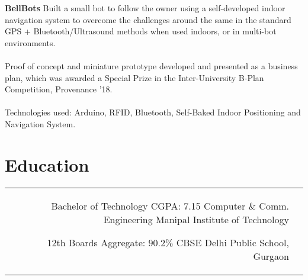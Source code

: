 \documentclass[10pt]{article} %
\begin{document}
\begin{paracol}{2}
{} %
{\textbf{BellBots}} %
{} %
{
Built a small bot to follow the owner using a self-developed indoor navigation system to overcome the challenges around the same in the standard GPS + Bluetooth/Ultrasound methods when used indoors, or in multi-bot environments.\\
\\
Proof of concept and miniature prototype developed and presented as a business plan, which was awarded a
Special Prize in the Inter-University B-Plan Competition, Provenance ’18.\\
\\
Technologies used: Arduino, RFID, Bluetooth, Self-Baked Indoor Positioning and Navigation System.
} %


\section{Education}





\begin{supertabular}{rl} %


	{Bachelor of Technology} %
	{CGPA: 7.15} %
	{Computer \& Comm. Engineering} %
	{Manipal Institute of Technology} %


	{12th Boards} %
	{Aggregate: 90.2\%} %
	{CBSE} %
	{Delhi Public School, Gurgaon} %


\end{supertabular}
\end{paracol}
\end{document}
